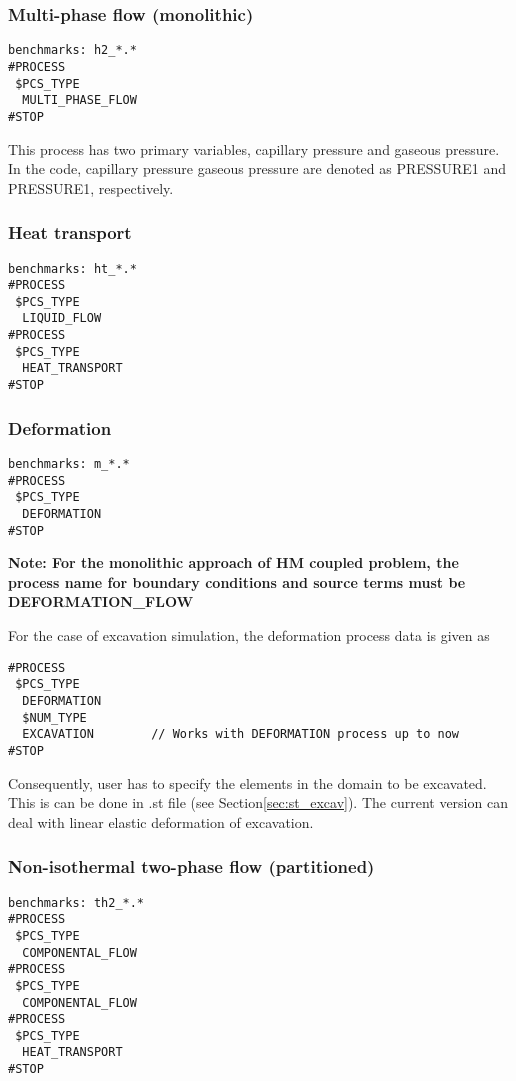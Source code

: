 {\subsubsection{Multi-phase flow (monolithic)}
\begin{verbatim}
benchmarks: h2_*.*
#PROCESS
 $PCS_TYPE
  MULTI_PHASE_FLOW
#STOP
\end{verbatim}
This process has two primary variables, capillary pressure and gaseous pressure. In the code,
 capillary pressure gaseous pressure are denoted as \mbox{PRESSURE1} and \mbox{PRESSURE1}, respectively.
\subsubsection{Heat transport}
\begin{verbatim}
benchmarks: ht_*.*
#PROCESS
 $PCS_TYPE
  LIQUID_FLOW
#PROCESS
 $PCS_TYPE
  HEAT_TRANSPORT
#STOP
\end{verbatim}
\subsubsection{Deformation}
\label{sec:pcs_dm}
\begin{verbatim}
benchmarks: m_*.*
#PROCESS
 $PCS_TYPE
  DEFORMATION
#STOP
\end{verbatim}
\textbf{Note: For the monolithic approach of HM coupled problem,
 the process name for boundary conditions and source terms
  must be DEFORMATION\_FLOW} %

For the case of excavation simulation, the deformation process data is given as
\begin{verbatim}
#PROCESS
 $PCS_TYPE
  DEFORMATION
  $NUM_TYPE
  EXCAVATION        // Works with DEFORMATION process up to now
#STOP
\end{verbatim}
Consequently, user has to specify the elements in the domain to be excavated.
This is can be done in .st file (see Section\ref{sec:st_excav}). The current version
  can deal with linear elastic deformation of excavation.

\subsubsection{Non-isothermal two-phase flow (partitioned)}
\begin{verbatim}
benchmarks: th2_*.*
#PROCESS
 $PCS_TYPE
  COMPONENTAL_FLOW
#PROCESS
 $PCS_TYPE
  COMPONENTAL_FLOW
#PROCESS
 $PCS_TYPE
  HEAT_TRANSPORT
#STOP
\end{verbatim}
}
